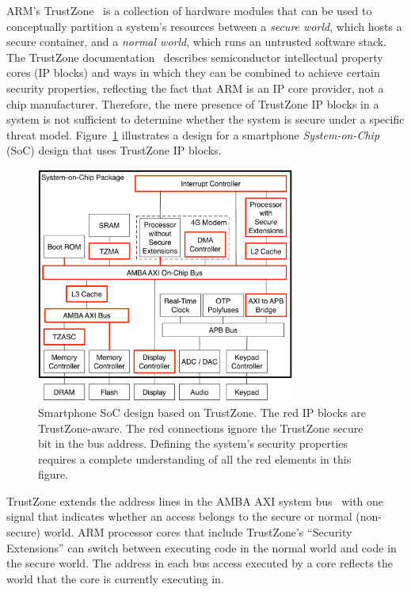 
ARM's TrustZone~\cite{alves2004trustzone} is a collection of hardware modules
that can be used to conceptually partition a system's resources between a
\textit{secure world}, which hosts a secure container, and a \textit{normal
world}, which runs an untrusted software stack. The TrustZone
documentation~\cite{arm2009trustzone} describes semiconductor intellectual
property cores (IP blocks) and ways in which they can be combined to achieve
certain security properties, reflecting the fact that ARM is an IP core
provider, not a chip manufacturer. Therefore, the mere presence of TrustZone IP
blocks in a system is not sufficient to determine whether the system is secure
under a specific threat model. Figure~\ref{fig:trustzone} illustrates a design
for a smartphone \textit{System-on-Chip} (SoC) design that uses TrustZone IP
blocks.

\begin{figure}[hbt]
  \centering
  \includegraphics[width=85mm]{figures/trustzone.pdf}
  \caption{
    Smartphone SoC design based on TrustZone. The red IP blocks are
    TrustZone-aware. The red connections ignore the TrustZone secure bit in the
    bus address. Defining the system's security properties requires a complete
    understanding of all the red elements in this figure.
  }
  \label{fig:trustzone}
\end{figure}

TrustZone extends the address lines in the AMBA AXI system
bus~\cite{arm2004ambaxi} with one signal that indicates whether an access
belongs to the secure or normal (non-secure) world. ARM processor cores that
include TrustZone's ``Security Extensions'' can switch between executing code
in the normal world and code in the secure world. The address in each bus
access executed by a core reflects the world that the core is currently
executing in.

